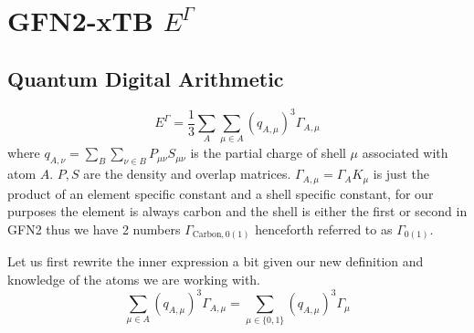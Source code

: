 \documentclass{article}
\begin{document}
\section{GFN2-xTB $E^\Gamma$}
\subsection{Quantum Digital Arithmetic}
\begin{equation}
    E^\Gamma = \frac{1}{3}\sum_A\sum_{\mu\in A} (q_{A,\mu})^3\Gamma_{A,\mu}
\end{equation}
where $q_{A,\nu}=\sum_B\sum_{\nu\in B}P_{\mu\nu}S_{\mu\nu}$ is the partial charge of shell $\mu$ associated with atom $A$. $P, S$ are the density and overlap matrices. $\Gamma_{A,\mu} = \Gamma_A K_\mu$ is just the product of an element specific constant and a shell specific constant, for our purposes the element is always carbon and the shell is either the first or second in GFN2 thus we have 2 numbers $\Gamma_{\text{Carbon},0(1)}$ henceforth referred to as $\varGamma_{0(1)}$. 

\vspace{\baselineskip}
\noindent
Let us first rewrite the inner expression a bit given our new definition and knowledge of the atoms we are working with. 
\begin{equation}
    \sum_{\mu\in A} (q_{A,\mu})^3\Gamma_{A,\mu} = \sum_{\mu \in \{0,1\}} (q_{A,\mu})^3\varGamma_{\mu}
\end{equation}
\end{document}
